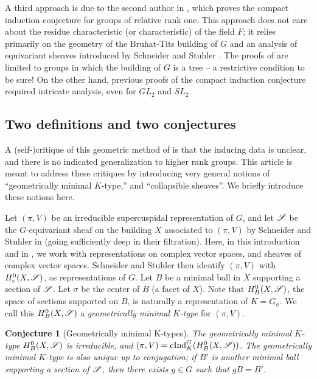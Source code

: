 \documentclass[letter]{amsart}
\newtheorem{conj}[thm]{Conjecture}
\theoremstyle{definition}
\theoremstyle{remark}
\numberwithin{thm}{section}
\numberwithin{equation}{section}
\begin{document}
A third approach is due to the second author in \cite{MWInd}, which proves the compact induction conjecture for groups of relative rank one.  This approach does not care about the residue characteristic (or characteristic) of the field $F$; it relies primarily on the geometry of the Bruhat-Tits building of $G$ and an analysis of equivariant sheaves introduced by Schneider and Stuhler \cite{SS}.  The proofs of \cite{MWInd} are limited to groups in which the building of $G$ is a tree -- a restrictive condition to be sure!  On the other hand, previous proofs of the compact induction conjecture required intricate analysis, even for $GL_2$ and $SL_2$.  

\subsection{Two definitions and two conjectures}

A (self-)critique of this geometric method of \cite{MWInd} is that the inducing data is unclear, and there is no indicated generalization to higher rank groups.  This article is meant to address these critiques by introducing very general notions of ``geometrically minimal $K$-type,'' and ``collapsible sheaves''.  We briefly introduce these notions here.

Let $(\pi, V)$ be an irreducible supercuspidal representation of $G$, and let ${\mathscr{S}}$ be the $G$-equivariant sheaf on the building $X$ associated to $(\pi, V)$ by Schneider and Stuhler in \cite{SS} (going sufficiently deep in their filtration).  Here, in this introduction and in \cite{SS}, we work with representations on complex vector spaces, and sheaves of complex vector spaces.  Schneider and Stuhler then identify $(\pi, V)$ with $H_c^0(X, {\mathscr{S}})$, as representations of $G$.  Let $B$ be a minimal ball in $X$ supporting a section of ${\mathscr{S}}$.  Let $\sigma$ be the center of $B$ (a facet of $X$).  Note that $H_B^0(X, {\mathscr{S}})$, the space of sections supported on $B$, is naturally a representation of $K = G_\sigma$.  We call this $H_B^0(X, {\mathscr{S}})$ a {\em geometrically minimal $K$-type} for $(\pi, V)$.
\begin{conj}[Geometrically minimal K-types]
\label{Ktype-conj}
The geometrically minimal $K$-type $H_B^0(X, {\mathscr{S}})$ is irreducible, and $(\pi, V) = \operatorname{cInd}_K^G( H_B^0(X, {\mathscr{S}}) )$.  The geometrically minimal $K$-type is also unique up to conjugation; if $B'$ is another minimal ball supporting a section of ${\mathscr{S}}$, then there exists $g \in G$ such that $g B = B'$.
\end{conj}
\end{document}
